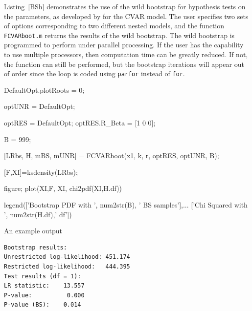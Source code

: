 \documentclass[article]{jss}
\begin{document}
Listing~\ref{BSh} demonstrates the use of the wild bootstrap for hypothesis tests on the parameters, as developed by \cite{Boswijk2013} for the CVAR model. The user specifies two sets of options corresponding to two different nested models, and the function \verb|FCVARboot.m| returns the results of the wild bootstrap. The wild bootstrap is programmed to perform under parallel processing. If the user has the capability to use multiple processors, then computation time can be greatly reduced. If not, the function can still be performed, but the bootstrap iterations will appear out of order since the loop is coded using \verb|parfor| instead of \verb|for|.

\begin{Code}


DefaultOpt.plotRoots = 0;

optUNR = DefaultOpt;

optRES = DefaultOpt;
optRES.R_Beta = [1 0 0];

B = 999;


[LRbs, H, mBS, mUNR] = FCVARboot(x1, k, r, optRES, optUNR, B);



[F,XI]=ksdensity(LRbs);

figure; plot(XI,F, XI, chi2pdf(XI,H.df))

legend(['Bootstrap PDF with ', num2str(B), ' BS samples'],...
    ['Chi Squared with ', num2str(H.df),' df'])
\end{Code}

An example output 
\begin{verbatim}
Bootstrap results:
Unrestricted log-likelihood: 451.174
Restricted log-likelihood:   444.395
Test results (df = 1):
LR statistic: 	 13.557
P-value: 	      0.000
P-value (BS): 	 0.014
\end{verbatim}
\end{document}
